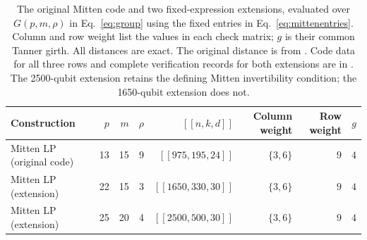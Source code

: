 \begin{table}[htbp]
\centering
\small
\caption{The original Mitten code and two fixed-expression extensions, evaluated over $G(p,m,\rho)$ in Eq.~\eqref{eq:group} using the fixed entries in Eq.~\eqref{eq:mittenentries}. Column and row weight list the values in each check matrix; $g$ is their common Tanner girth. All distances are exact. The original distance is from \cite{qedist}. Code data for all three rows and complete verification records for both extensions are in \cite{certificates}. The 2500-qubit extension retains the defining Mitten invertibility condition; the 1650-qubit extension does not.}
\label{tab:comparison}
\begin{tabular}{lrrrrrrr}
\toprule
Construction&$p$&$m$&$\rho$&$[[n,k,d]]$&Column weight&Row weight&$g$\\
\midrule
Mitten LP (original code)~\cite{mitten}&13&15&9&$[[975,195,24]]$&$\{3,6\}$&$9$&$4$\\
Mitten LP (extension)&22&15&3&$[[1650,330,30]]$&$\{3,6\}$&$9$&$4$\\
Mitten LP (extension)&25&20&4&$[[2500,500,30]]$&$\{3,6\}$&$9$&$4$\\
\bottomrule
\end{tabular}
\end{table}
